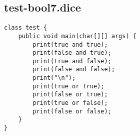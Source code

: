 \subsection{test-bool7.dice}
\begin{verbatim}
class test {
	public void main(char[][] args) {
		print(true and true);
		print(false and true);
		print(true and false);
		print(false and false);
		print("\n");
		print(true or true);
		print(false or true);
		print(true or false);
		print(false or false);
	}
}
\end{verbatim}